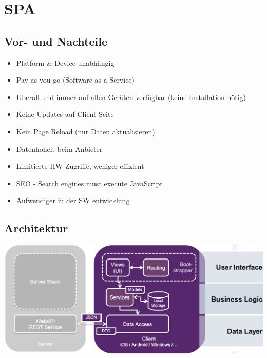 


\section{SPA}




\subsection{Vor- und Nachteile}
\begin{itemize}[label={\textcolor{darkGreen}{+}}]
    \item Platform \& Device unabhängig
    \item Pay as you go (Software as a Service)
    \item Überall und immer auf allen Geräten verfügbar (keine Installation nötig)
    \item Keine Updates auf Client Seite
    \item Kein Page Reload (nur Daten aktualisieren)
\end{itemize}
\begin{itemize}[label={\textcolor{red}{--}}]
    \item Datenhoheit beim Anbieter
    \item Limitierte HW Zugriffe, weniger effizient
    \item SEO - Search engines must execute JavaScript
    \item Aufwendiger in der SW entwicklung
\end{itemize}

\subsection{Architektur}
\begin{center}
    \vspace{-4pt}
    \includegraphics[width=1.02\linewidth]{./img/01-spa/architecture_layers}
    \vspace{-16pt}
\end{center}

